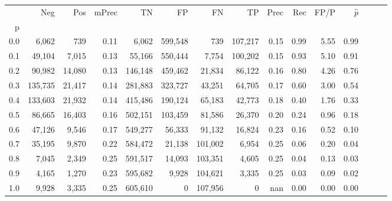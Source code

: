 \begin{tabular}{rrrrrrrrrrrrrrr}
\toprule
{} &      Neg &     Pos & mPrec &       TN &       FP &       FN &       TP &  Prec &   Rec &  FP/P & $\hat{p}$ \\
p   &          &         &       &          &          &          &          &       &       &       &           \\
\midrule
0.0 &    6,062 &     739 &  0.11 &    6,062 &  599,548 &      739 &  107,217 &  0.15 &  0.99 &  5.55 &      0.99 \\
0.1 &   49,104 &   7,015 &  0.13 &   55,166 &  550,444 &    7,754 &  100,202 &  0.15 &  0.93 &  5.10 &      0.91 \\
0.2 &   90,982 &  14,080 &  0.13 &  146,148 &  459,462 &   21,834 &   86,122 &  0.16 &  0.80 &  4.26 &      0.76 \\
0.3 &  135,735 &  21,417 &  0.14 &  281,883 &  323,727 &   43,251 &   64,705 &  0.17 &  0.60 &  3.00 &      0.54 \\
0.4 &  133,603 &  21,932 &  0.14 &  415,486 &  190,124 &   65,183 &   42,773 &  0.18 &  0.40 &  1.76 &      0.33 \\
0.5 &   86,665 &  16,403 &  0.16 &  502,151 &  103,459 &   81,586 &   26,370 &  0.20 &  0.24 &  0.96 &      0.18 \\
0.6 &   47,126 &   9,546 &  0.17 &  549,277 &   56,333 &   91,132 &   16,824 &  0.23 &  0.16 &  0.52 &      0.10 \\
0.7 &   35,195 &   9,870 &  0.22 &  584,472 &   21,138 &  101,002 &    6,954 &  0.25 &  0.06 &  0.20 &      0.04 \\
0.8 &    7,045 &   2,349 &  0.25 &  591,517 &   14,093 &  103,351 &    4,605 &  0.25 &  0.04 &  0.13 &      0.03 \\
0.9 &    4,165 &   1,270 &  0.23 &  595,682 &    9,928 &  104,621 &    3,335 &  0.25 &  0.03 &  0.09 &      0.02 \\
1.0 &    9,928 &   3,335 &  0.25 &  605,610 &        0 &  107,956 &        0 &   nan &  0.00 &  0.00 &      0.00 \\
\bottomrule
\end{tabular}
